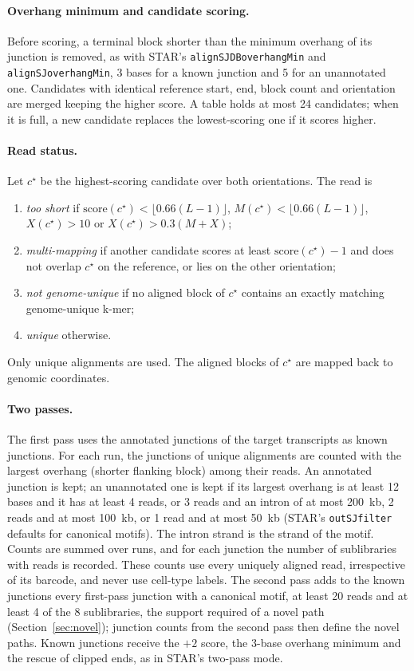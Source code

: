 \documentclass[11pt]{article}
\begin{document}
\paragraph{Overhang minimum and candidate scoring.} Before scoring, a terminal block shorter than the minimum overhang of its junction is removed, as with STAR's \texttt{alignSJDBoverhangMin} and \texttt{alignSJoverhangMin}, 3 bases for a known junction and 5 for an unannotated one. Candidates with identical reference start, end, block count and orientation are merged keeping the higher score. A table holds at most 24 candidates; when it is full, a new candidate replaces the lowest-scoring one if it scores higher.

\paragraph{Read status.} Let $c^\star$ be the highest-scoring candidate over both orientations. The read is
\begin{enumerate}[leftmargin=*]
  \item \emph{too short} if $\mathrm{score}(c^\star)<\lfloor0.66(L-1)\rfloor$, $M(c^\star)<\lfloor0.66(L-1)\rfloor$, $X(c^\star)>10$ or $X(c^\star)>0.3(M+X)$;
  \item \emph{multi-mapping} if another candidate scores at least $\mathrm{score}(c^\star)-1$ and does not overlap $c^\star$ on the reference, or lies on the other orientation;
  \item \emph{not genome-unique} if no aligned block of $c^\star$ contains an exactly matching genome-unique k-mer;
  \item \emph{unique} otherwise.
\end{enumerate}
Only unique alignments are used. The aligned blocks of $c^\star$ are mapped back to genomic coordinates.

\paragraph{Two passes.} The first pass uses the annotated junctions of the target transcripts as known junctions. For each run, the junctions of unique alignments are counted with the largest overhang (shorter flanking block) among their reads. An annotated junction is kept; an unannotated one is kept if its largest overhang is at least 12 bases and it has at least 4 reads, or 3 reads and an intron of at most 200~kb, 2 reads and at most 100~kb, or 1 read and at most 50~kb (STAR's \texttt{outSJfilter} defaults for canonical motifs). The intron strand is the strand of the motif. Counts are summed over runs, and for each junction the number of sublibraries with reads is recorded. These counts use every uniquely aligned read, irrespective of its barcode, and never use cell-type labels. The second pass adds to the known junctions every first-pass junction with a canonical motif, at least 20 reads and at least 4 of the 8 sublibraries, the support required of a novel path (Section~\ref{sec:novel}); junction counts from the second pass then define the novel paths. Known junctions receive the $+2$ score, the 3-base overhang minimum and the rescue of clipped ends, as in STAR's two-pass mode.
\end{document}
